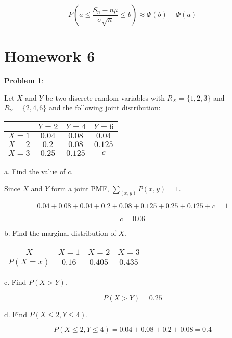 \documentclass{article}
\begin{document}
\[P(a\le\frac{S_n-n\mu}{\sigma\sqrt{n}}\le b)\approx\Phi(b)-\Phi(a)\]

\section{Homework 6}

\noindent\textbf{Problem 1}:

Let $X$ and $Y$ be two discrete random variables with $R_X=\{1,2,3\}$ and $R_Y=\{2,4,6\}$ and the following joint distribution:

\begin{center}
    \begin{tabular}{ | c | c | c | c | }
        \hline
        &$Y=2$ & $Y=4$ & $Y=6$ \\ 
        \hline
        $X=1$&$0.04$&$0.08$&$0.04$\\
        \hline
        $X=2$&$0.2$&$0.08$&$0.125$\\
        \hline
        $X=3$&$0.25$&$0.125$&$c$\\
        \hline
    \end{tabular}
\end{center}

\indent a. Find the value of $c$.

{\color{blue}

Since $X$ and $Y$ form a joint PMF, $\underset{(x,y)}{\sum}P(x,y)=1$. 

\[0.04+0.08+0.04+0.2+0.08+0.125+0.25+0.125+c=1\]

\[c=0.06\]
}

\indent b. Find the marginal distribution of $X$.

{\color{blue}

\begin{center}
    \begin{tabular}{ |c|c|c|c| }
        \hline
        $X$&$X=1$ & $X=2$ & $X=3$ \\ 
        \hline
        $P(X=x)$&$0.16$&$0.405$&$0.435$\\
        \hline
    \end{tabular}
\end{center}

}

\indent c. Find $P(X>Y)$.

{\color{blue}

\[P(X>Y)=0.25\]

}

\indent d. Find $P(X\le2,Y\le4)$.

{\color{blue}

\[P(X\le2,Y\le4)=0.04+0.08+0.2+0.08=0.4\]

}
\end{document}
